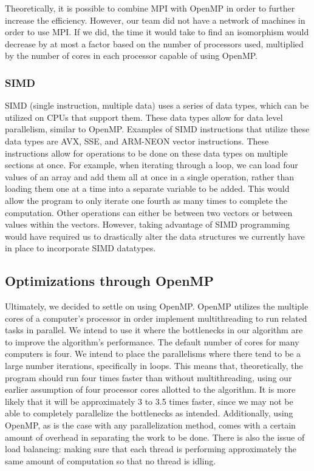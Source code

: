 \documentclass{article}
\begin{document}
    Theoretically, it is possible to combine MPI with OpenMP in order to further increase the efficiency. However, our team did not have a network of machines in order to use MPI. If we did, the time it would take to find an isomorphism would decrease by at most a factor based on the number of processors used, multiplied by the number of cores in each processor capable of using OpenMP.

    \subsubsection{SIMD}
    SIMD (single instruction, multiple data) uses a series of data types, which can be utilized on CPUs that support them. These data types allow for data level parallelism, similar to OpenMP. Examples of SIMD instructions that utilize these data types are AVX, SSE, and ARM-NEON vector instructions. These instructions allow for operations to be done on these data types on multiple sections at once. For example, when iterating through a loop, we can load four values of an array and add them all at once in a single operation, rather than loading them one at a time into a separate variable to be added. This would allow the program to only iterate one fourth as many times to complete the computation. Other operations can either be between two vectors or between values within the vectors. However, taking advantage of SIMD programming would have required us to drastically alter the data structures we currently have in place to incorporate SIMD datatypes.

  \subsection{Optimizations through OpenMP}
  Ultimately, we decided to settle on using OpenMP. OpenMP utilizes the multiple cores of a computer's processor in order implement multithreading to run related tasks in parallel. We intend to use it where the bottlenecks in our algorithm are to improve the algorithm's performance. The default number of cores for many computers is four. We intend to place the parallelisms where there tend to be a large number iterations, specifically in loops. This means that, theoretically, the program should run four times faster than without multithreading, using our earlier assumption of four processor cores allotted to the algorithm. It is more likely that it will be approximately 3 to 3.5 times faster, since we may not be able to completely parallelize the bottlenecks as intended. Additionally, using OpenMP, as is the case with any parallelization method, comes with a certain amount of overhead in separating the work to be done. There is also the issue of load balancing: making sure that each thread is performing approximately the same amount of computation so that no thread is idling.
\end{document}
